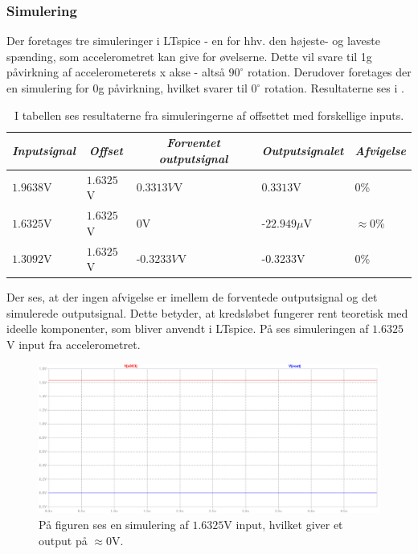 \subsubsection{Simulering}
Der foretages tre simuleringer i LTspice - en for hhv. den højeste- og laveste spænding, som accelerometret kan give for øvelserne. Dette vil svare til 1g påvirkning af accelerometerets x akse - altså $90^{\circ}$ rotation. Derudover foretages der en simulering for 0g påvirkning, hvilket svarer til $0^{\circ}$ rotation. Resultaterne ses i .
\begin{table}[H]
	\centering
	\begin{tabular}{|l|l|l|l|l|}
		\hline
		\multicolumn{1}{|c|}{\textit{Inputsignal}} & \multicolumn{1}{c|}{\textit{Offset}} & \multicolumn{1}{c|}{\textit{Forventet outputsignal}} & \multicolumn{1}{c|}{\textit{Outputsignalet}} & \multicolumn{1}{c|}{\textit{Afvigelse}} \\ \hline
		$1.9638$V     & $1.6325$V    & $0.3313V$V    & $0.3313$V       & $0$\%              \\ \hline
		$1.6325$V     & $1.6325$V    & $0$V          & -$22.949\mu$V   & $\approx 0$\%      \\ \hline
		$1.3092$V     & $1.6325$V    & -$0.3233V$V   & -$0.3233$V      & $0$\%                \\ \hline
	\end{tabular}
	\caption{I tabellen ses resultaterne fra simuleringerne af offsettet med forskellige inputs.}
	\label{Tab:offset_sim}
\end{table}
\noindent Der ses, at der ingen afvigelse er imellem de forventede outputsignal og det simulerede outputsignal. Dette betyder, at kredsløbet fungerer rent teoretisk med ideelle komponenter, som bliver anvendt i LTspice. På  ses simuleringen af $1.6325$V input fra accelerometret.
 
\begin{figure}[H]
\centering
\includegraphics[scale=0.3]{figures/cProblemloesning/Offset_simulering.png}
\caption{På figuren ses en simulering af $1.6325$V input, hvilket giver et output på $\approx 0$V.}
\label{fig:Offset_simulering}
\end{figure}

